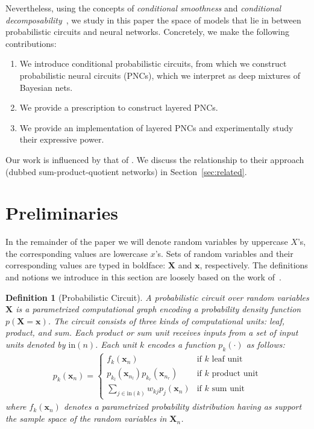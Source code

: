 \documentclass[letterpaper]{article} %
\newtheorem{definition}[theorem]{Definition}
\newcommand{\circuit}{\ensuremath{p}}
\newcommand{\inputs}{\ensuremath{\text{in}}}
\newcommand{\Xvars}{\ensuremath{\mathbf{X}}}
\newcommand{\xvars}{\ensuremath{\mathbf{x}}}
\newcommand{\Xvar}{\ensuremath{X}}
\newcommand{\xvar}{\ensuremath{x}}
\newcommand{\weight}{\ensuremath{w}}
\begin{document}
Nevertheless, using the concepts of \textit{conditional smoothness} and \textit{conditional decomposability}~\citep{sharir2018sum}, we study in this paper the space of models that lie in between probabilistic circuits and neural networks.
Concretely, we make the following contributions:
\begin{enumerate}
	\item We introduce conditional probabilistic circuits, from which we construct  probabilistic neural circuits (PNCs), which we interpret as deep mixtures of Bayesian nets.
	\item  We provide a prescription to construct layered PNCs.
	\item We provide an implementation of layered PNCs and experimentally study their expressive power.
\end{enumerate}

Our work is influenced by that of \citet{sharir2018sum}. We discuss the relationship to their approach (dubbed sum-product-quotient networks) in Section~\ref{sec:related}.




\section{Preliminaries}
\label{sec:prelim}

In the remainder of the paper we will denote random variables by uppercase $\Xvar$'s, the corresponding values are lowercase $\xvar$'s. Sets of random variables and their corresponding values are typed in boldface: $\Xvars$ and $\xvars$, respectively.
The definitions and notions we introduce in this section are loosely based on the work of~\citet{vergari2021compositional}.

\begin{definition}[Probabilistic Circuit]
	\label{def:circuit}
	A probabilistic circuit over random variables $\Xvars$ is a parametrized computational graph encoding a probability density function $\circuit(\Xvars{=}\xvars)$.
	The circuit consists of three kinds of computational units:
	\textit{leaf}, \textit{product}, and \textit{sum}.
	Each product or sum unit receives inputs from a set of input units denoted by $\inputs(n)$.
	Each unit $k$ encodes a function $\circuit_{k}(\cdot)$ as follows:
	\begin{align*}
		{\circuit}_k(\xvars_n)=
		\begin{cases}
			f_k({\xvars_n})                                             & \text{if $k$ leaf unit}    \\
			\circuit_{k_l}(\xvars_{n_l})  \circuit_{k_r} (\xvars_{n_r}) & \text{if $k$ product unit} \\
			\sum_{j\in\inputs(k)} \weight_{kj} \circuit_j(\xvars_n)     & \text{if $k$ sum unit}
		\end{cases}
	\end{align*}
	where $f_k(\xvars_n)$  denotes a parametrized probability distribution having as support the sample space of the random variables in $\Xvars_n$.
\end{definition}
\end{document}
